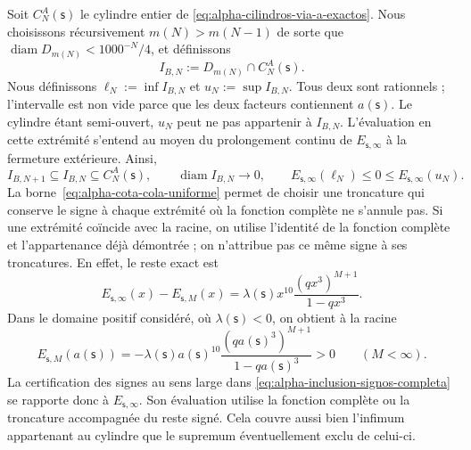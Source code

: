 Soit \(C_N^A(\mathsf s)\) le cylindre entier de \eqref{eq:alpha-cilindros-via-a-exactos}. Nous choisissons récursivement \(m(N)>m(N-1)\) de sorte que \(\operatorname{diam}D_{m(N)}<1000^{-N}/4\), et définissons
\begin{equation}
I_{B,N}:=D_{m(N)}\cap C_N^A(\mathsf s).
 \label{eq:alpha-intervalos-b-completos}
\end{equation}
Nous définissons
\(\ell_N:=\inf I_{B,N}\) et \(u_N:=\sup I_{B,N}\). Tous deux sont rationnels ;
l'intervalle est non vide parce que les deux facteurs contiennent
\(a(\mathsf s)\). Le cylindre étant semi-ouvert, \(u_N\) peut ne pas
appartenir à \(I_{B,N}\). L'évaluation en cette extrémité s'entend au moyen
du prolongement continu de \(E_{\mathsf s,\infty}\) à la fermeture extérieure. Ainsi,
\begin{equation}
 I_{B,N+1}\subseteq I_{B,N}\subseteq C_N^A(\mathsf s),
 \qquad \operatorname{diam}I_{B,N}\longrightarrow0,
 \qquad E_{\mathsf s,\infty}(\ell_N)\leq0\leq
 E_{\mathsf s,\infty}(u_N).
 \label{eq:alpha-inclusion-signos-completa}
\end{equation}
La borne~\eqref{eq:alpha-cota-cola-uniforme} permet de choisir une
troncature qui conserve le signe à chaque extrémité où la fonction complète
ne s'annule pas. Si une extrémité coïncide avec la racine, on utilise l'identité de
la fonction complète et l'appartenance déjà démontrée ; on n'attribue pas ce même
signe à ses troncatures. En effet, le reste exact est
\[
 E_{\mathsf s,\infty}(x)-E_{\mathsf s,M}(x)
 =\lambda(\mathsf s)x^{10}
   \frac{(qx^3)^{M+1}}{1-qx^3}.
\]
Dans le domaine positif considéré, où \(\lambda(\mathsf s)<0\), on obtient à la racine
\[
 E_{\mathsf s,M}(a(\mathsf s))
 =-\lambda(\mathsf s)a(\mathsf s)^{10}
   \frac{(qa(\mathsf s)^3)^{M+1}}{1-qa(\mathsf s)^3}>0
 \qquad(M<\infty).
\]
La certification des signes au sens large dans \eqref{eq:alpha-inclusion-signos-completa} se rapporte donc à \(E_{\mathsf s,\infty}\). Son évaluation utilise la fonction complète ou la troncature accompagnée du reste signé. Cela couvre aussi bien l'infimum appartenant au cylindre que le supremum éventuellement exclu de celui-ci.

